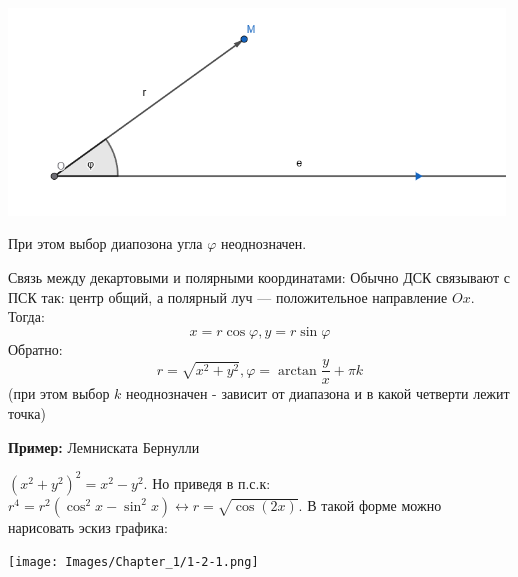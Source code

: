 \begin{center}
    \includegraphics[height = 5.5cm]{Images/Chapter_1/1-2-4.png}
\end{center}
    
    

При этом выбор диапозона угла \(\varphi\) неоднозначен.

Связь между декартовыми и полярными координатами: Обычно ДСК связывают с ПСК так: центр общий, а полярный луч --- положительное направление \(Ox\). Тогда:
\[x=r\cos\varphi, y=r\sin\varphi\] 
Обратно: \[r=\sqrt{x^2 + y^2}, \varphi=\arctan\frac{y}{x} + \pi k\] (при этом выбор $k$ неоднозначен - зависит от диапазона и в какой четверти лежит точка)

\textbf{Пример:} Лемниската Бернулли

$(x^2+y^2)^2=x^2-y^2$. Но приведя в п.с.к:  \(r^4=r^2(\cos^2x-\sin^2x)\leftrightarrow r=\sqrt{\cos(2x)}\). В такой форме можно нарисовать эскиз графика:
\begin{center}
    \texttt{[image: Images/Chapter\_1/1-2-1.png]}
\end{center}

\newpage

